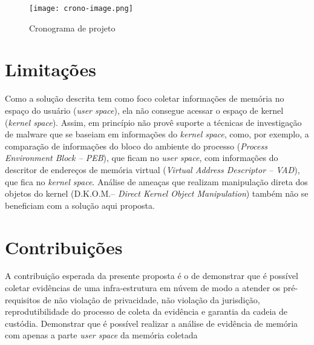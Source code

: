 \begin{figure}[htb!]
\footnotesize
\caption{Cronograma de projeto}
\texttt{[image: crono-image.png]}
\centering
\label{fig:cronograma}
\end{figure}

\section{Limitações}
\label{sec:limitacoes}

Como a solução descrita tem como foco coletar informações de memória no espaço do usuário (\textit{user space}), ela não consegue acessar o espaço de kernel (\textit{kernel space}). 
%
Assim, \fancyname em princípio não provê suporte a técnicas de investigação de malware que se baseiam em informações do \textit{kernel space}, como, por exemplo, a comparação de informações do bloco do ambiente do processo (\textit{Process Environment Block -- PEB}), que ficam no \textit{user space}, com informações do descritor de endereços de memória virtual (\textit{Virtual Address Descriptor -- VAD}), que fica no \textit{kernel space}. 
%
Análise de ameaças que realizam manipulação direta dos objetos do kernel (D.K.O.M.-- \textit{Direct Kernel Object Manipulation}) também não se beneficiam com a solução aqui proposta. 

\section{Contribuições}
\label{sec:contribuições}

A contribuição esperada da presente proposta é o de demonstrar que é possível coletar evidências de uma infra-estrutura em núvem de modo a atender os pré-requisitos de não violação de privacidade, não violação da jurisdição, reprodutibilidade do processo de coleta da evidência e garantia da cadeia de custódia.
%
Demonstrar que é possível realizar a análise de evidência de memória com apenas a parte \textit{user space} da memória coletada

